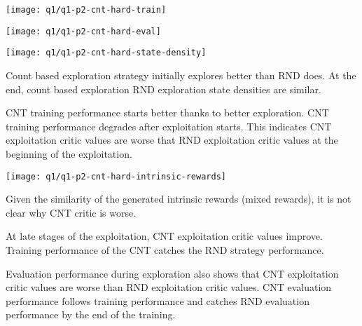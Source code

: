 \documentclass[11pt]{article}
\begin{document}
    \hspace*{-0.6in}
    \texttt{[image: q1/q1-p2-cnt-hard-train]}

    \hspace*{-0.6in}
    \texttt{[image: q1/q1-p2-cnt-hard-eval]}

    \hspace*{-0.6in}
    \texttt{[image: q1/q1-p2-cnt-hard-state-density]}

    Count based exploration strategy initially explores better than RND does.
    At the end, count based exploration RND exploration state densities are similar.

    CNT training performance starts better thanks to better exploration.
    CNT training performance degrades after exploitation starts.
    This indicates CNT exploitation critic values are worse that RND exploitation critic values at the beginning of the exploitation.

    \hspace*{-0.6in}
    \texttt{[image: q1/q1-p2-cnt-hard-intrinsic-rewards]}

    Given the similarity of the generated intrinsic rewards (mixed rewards), it is not clear why CNT critic is worse.

    At late stages of the exploitation, CNT exploitation critic values improve.
    Training performance of the CNT catches the RND strategy performance.

    Evaluation performance during exploration also shows that CNT exploitation critic values are worse than RND exploitation critic values.
    CNT evaluation performance follows training performance and catches RND evaluation performance by the end of the training.
\end{document}
